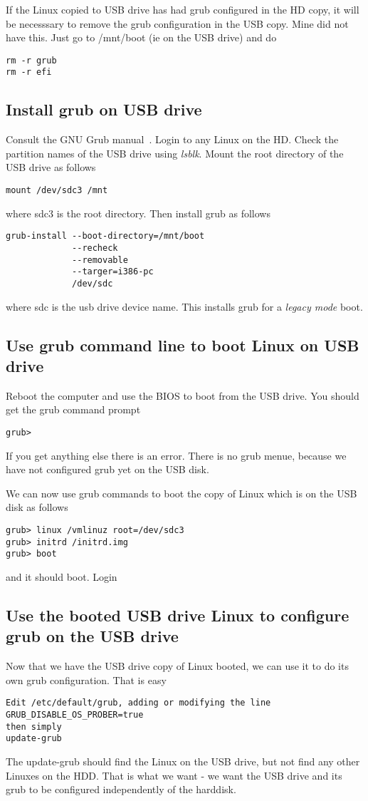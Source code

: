 \documentclass{article}  %
\begin{document}
If the Linux copied to USB drive has had grub configured in the HD copy, it will be necesssary to remove the grub configuration in the USB copy. Mine did not have this. Just go to /mnt/boot (ie on the USB drive) and do 
\begin{verbatim}
rm -r grub
rm -r efi
\end{verbatim}

\subsection{Install grub on USB drive}
Consult the GNU Grub manual~\cite{gnu:21}.
Login to any Linux on the HD.  Check the partition names of the USB drive using {\em lsblk}. Mount the root directory of the USB drive as follows
\begin{verbatim}
mount /dev/sdc3 /mnt
\end{verbatim} 
where sdc3 is the root directory. Then install grub as follows
\begin{verbatim}
grub-install --boot-directory=/mnt/boot 
             --recheck 
             --removable 
             --targer=i386-pc 
             /dev/sdc
\end{verbatim}
where sdc is the usb drive device name. 
This installs grub for a {\em legacy mode} boot.

\subsection{Use grub command line to boot Linux on USB drive}
Reboot the computer and use the BIOS to boot from the USB drive. You should get the grub command prompt
\begin{verbatim}
grub>
\end{verbatim}
If you get anything else there is an error.
There is no grub menue, because we have not configured grub yet on the USB disk.

We can now use grub commands to boot the copy of Linux which is on the USB disk as follows
\begin{verbatim}
grub> linux /vmlinuz root=/dev/sdc3
grub> initrd /initrd.img
grub> boot
\end{verbatim}
and it should boot. Login

\subsection{Use the booted USB drive Linux to configure grub on the USB drive}
Now that we have the USB drive copy of Linux booted, we can use it to do its own grub configuration.
That is easy
\begin{verbatim}
Edit /etc/default/grub, adding or modifying the line
GRUB_DISABLE_OS_PROBER=true
then simply
update-grub
\end{verbatim}
The update-grub should find the Linux on the USB drive, but not find any other Linuxes on the HDD. That is what we want - we want the USB drive and its grub to be configured independently of the harddisk.
\end{document}
